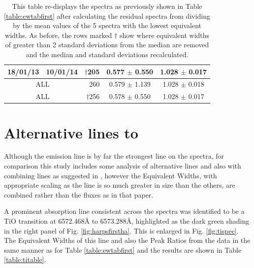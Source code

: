 {\begin{table}[!htbp]
{\begin{tabular}{|l|l|r|c|c|}
18/01/13 & 10/01/14 & $\dagger$205 & 0.577 $ \pm $ 0.550 & 1.028 $ \pm $ 0.017 \\\hline
\multicolumn{2}{|c|}{ALL} & 260 & 0.579 $ \pm $ 1.139 & 1.028 $ \pm $ 0.018 \\\hline
\multicolumn{2}{|c|}{ALL} & $\dagger$256 & 0.578 $ \pm $ 0.550 & 1.028 $ \pm $ 0.017 \\\hline
\end{tabular}}
\caption{This table re-displays the {\harps} spectra as previously shown in Table \ref{table:ewtabfirst} after
  calculating the residual spectra from dividing by the mean values of the 5 spectra with the lowest equivalent
  widths. As before, the rows marked {$\dagger$} show where equivalent   widths of greater  than 2 standard deviations
  from the median are removed and the median and standard deviations recalculated.}
\protect\label{table:divcompar}
\end{table}}

\section{Alternative lines to {\ha}}
\protect\label{section:alternativelines}

Although the {\ha} emission line is by far the strongest line on the {\prox} spectra, for comparison this study includes
some analysis of alternative lines and also with combining lines as suggested in \citet{hall99}, however the Equivalent
Widths, with appropriate scaling as the {\ha} line is so much greater in size than the others, are combined rather than
the fluxes as in that paper.

A prominent absorption line consistent across the spectra was identified to be a TiO transition at 6572.468{\AA} to
6573.288{\AA}, highlighted as the dark green shading in the right panel of Fig. \ref{fig:harpsfirstha}. This is enlarged
in Fig. \ref{fig:tispec}. The Equivalent Widths of this line and also the Peak Ratios from the {\harps} data in the same
manner as for Table \ref{table:ewtabfirst} and the results are shown in Table \ref{table:titable}.

